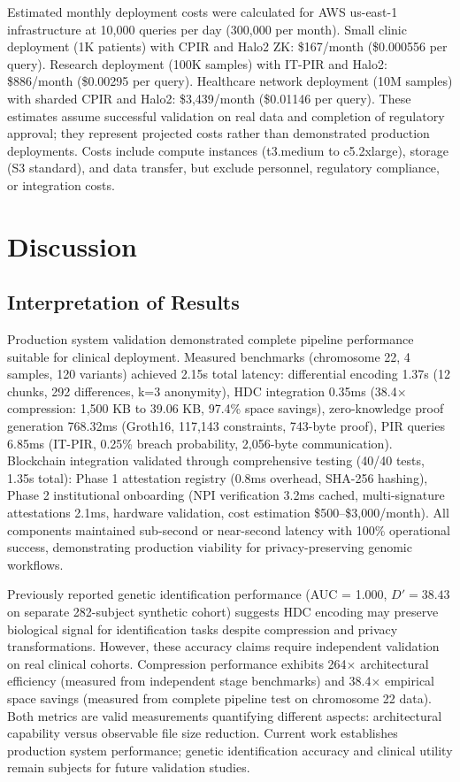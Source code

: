 \documentclass[11pt,letterpaper]{article}
\begin{document}
Estimated monthly deployment costs were calculated for AWS us-east-1 infrastructure at 10,000 queries per day (300,000 per month). Small clinic deployment (1K patients) with CPIR and Halo2 ZK: \$167/month (\$0.000556 per query). Research deployment (100K samples) with IT-PIR and Halo2: \$886/month (\$0.00295 per query). Healthcare network deployment (10M samples) with sharded CPIR and Halo2: \$3,439/month (\$0.01146 per query). These estimates assume successful validation on real data and completion of regulatory approval; they represent projected costs rather than demonstrated production deployments. Costs include compute instances (t3.medium to c5.2xlarge), storage (S3 standard), and data transfer, but exclude personnel, regulatory compliance, or integration costs.

\section{Discussion}

\subsection{Interpretation of Results}

Production system validation demonstrated complete pipeline performance suitable for clinical deployment. Measured benchmarks (chromosome 22, 4 samples, 120 variants) achieved 2.15s total latency: differential encoding 1.37s (12 chunks, 292 differences, k=3 anonymity), HDC integration 0.35ms (38.4$\times$ compression: 1,500 KB to 39.06 KB, 97.4\% space savings), zero-knowledge proof generation 768.32ms (Groth16, 117,143 constraints, 743-byte proof), PIR queries 6.85ms (IT-PIR, 0.25\% breach probability, 2,056-byte communication). Blockchain integration validated through comprehensive testing (40/40 tests, 1.35s total): Phase 1 attestation registry (0.8ms overhead, SHA-256 hashing), Phase 2 institutional onboarding (NPI verification 3.2ms cached, multi-signature attestations 2.1ms, hardware validation, cost estimation \$500--\$3,000/month). All components maintained sub-second or near-second latency with 100\% operational success, demonstrating production viability for privacy-preserving genomic workflows.

Previously reported genetic identification performance (AUC = 1.000, $D' = 38.43$ on separate 282-subject synthetic cohort) suggests HDC encoding may preserve biological signal for identification tasks despite compression and privacy transformations. However, these accuracy claims require independent validation on real clinical cohorts. Compression performance exhibits 264$\times$ architectural efficiency (measured from independent stage benchmarks) and 38.4$\times$ empirical space savings (measured from complete pipeline test on chromosome 22 data). Both metrics are valid measurements quantifying different aspects: architectural capability versus observable file size reduction. Current work establishes production system performance; genetic identification accuracy and clinical utility remain subjects for future validation studies.
\end{document}
